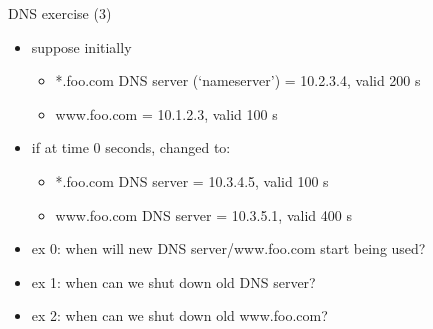 \begin{frame}{DNS exercise (3)}
    \begin{itemize}
    \item suppose initially
        \begin{itemize}
        \item *.foo.com DNS server (`nameserver') = 10.2.3.4, valid 200 s
        \item www.foo.com = 10.1.2.3, valid 100 s
        \end{itemize}
    \item if at time 0 seconds, changed to:
        \begin{itemize}
        \item *.foo.com DNS server = 10.3.4.5, valid 100 s
        \item www.foo.com DNS server = 10.3.5.1, valid 400 s
        \end{itemize}
    \item ex 0: when will new DNS server/www.foo.com start being used?
    \item ex 1: when can we shut down old DNS server?
    \item ex 2: when can we shut down old www.foo.com?
    \end{itemize}
\end{frame}
